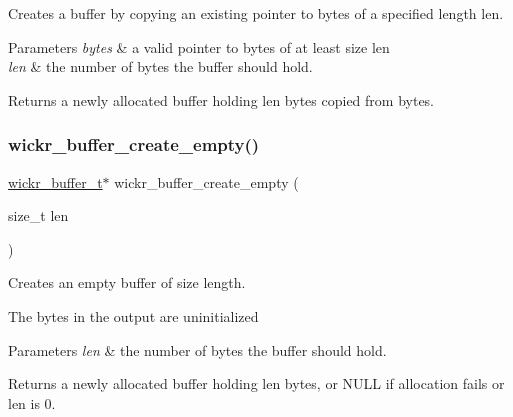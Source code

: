 Creates a buffer by copying an existing pointer to bytes of a specified length len. 


\begin{DoxyParams}{Parameters}
{\em bytes} & a valid pointer to bytes of at least size len \\
\hline
{\em len} & the number of bytes the buffer should hold. \\
\hline
\end{DoxyParams}
\begin{DoxyReturn}{Returns}
a newly allocated buffer holding len bytes copied from bytes. 
\end{DoxyReturn}
\mbox{\label{group__wickr__buffer_ga305edd191e38eb040710b631c1e4f05f}} 
\subsubsection{\texorpdfstring{wickr\+\_\+buffer\+\_\+create\+\_\+empty()}{wickr\_buffer\_create\_empty()}}
{\footnotesize\ttfamily \hyperlink{structwickr__buffer}{wickr\+\_\+buffer\+\_\+t}$\ast$ wickr\+\_\+buffer\+\_\+create\+\_\+empty (\begin{DoxyParamCaption}\item[{size\+\_\+t}]{len }\end{DoxyParamCaption})}



Creates an empty buffer of size length. 

The bytes in the output are uninitialized


\begin{DoxyParams}{Parameters}
{\em len} & the number of bytes the buffer should hold. \\
\hline
\end{DoxyParams}
\begin{DoxyReturn}{Returns}
a newly allocated buffer holding len bytes, or N\+U\+LL if allocation fails or len is 0. 
\end{DoxyReturn}
\mbox{\label{group__wickr__buffer_gaba0ae148a2f75e50eb3d36a4bef509d2}} 
